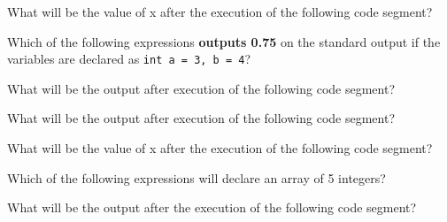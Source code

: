 \documentclass[11pt]{examdesign}
\begin{document}


\begin{multiplechoice}[title={},suppressprefix=yes,rearrange=no]
\begin{question}
What will be the value of x after the execution of the following code segment?
\end{question}

\begin{question}
Which of the following expressions \textbf{outputs 0.75} on the standard output if the variables are declared as \texttt{int a = 3, b = 4}?
\end{question}

\begin{question}
What will be the output after execution of the following code segment?
\end{question}

\begin{question}
What will be the output after execution of the following code segment?
\end{question}

\begin{question}
What will be the value of x after the execution of the following code segment?
\end{question}
  
\begin{question}
Which of the following expressions will declare an array of 5 integers?
\end{question}
  
\begin{question}
What will be the output after the execution of the following code segment?
\end{question}
  

\end{multiplechoice}
\end{document}
